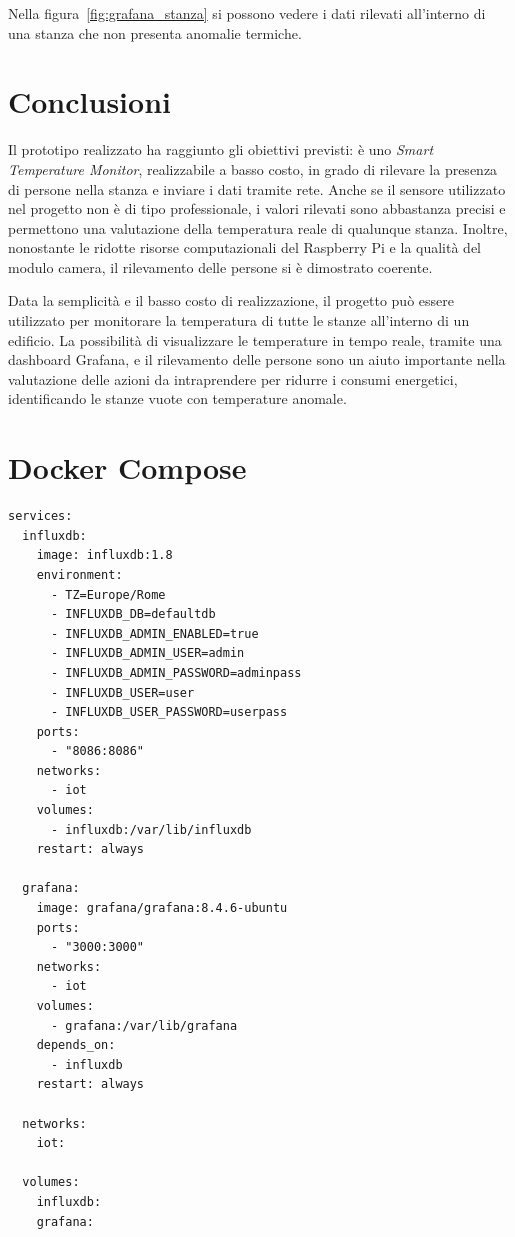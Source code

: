 \documentclass[italian,12pt,a4paper,oneside,final]{report}
\begin{document}
Nella figura~\ref{fig:grafana_stanza} si possono vedere i dati rilevati all'interno di una stanza che non presenta anomalie termiche.

\newpage

\section{Conclusioni}
Il prototipo realizzato ha raggiunto gli obiettivi previsti: è uno \textit{Smart Temperature Monitor}, realizzabile a basso costo, in grado di rilevare la presenza di persone nella stanza e inviare i dati tramite rete.
Anche se il sensore utilizzato nel progetto non è di tipo professionale, i valori rilevati sono abbastanza precisi e permettono una valutazione della temperatura reale di qualunque stanza.
Inoltre, nonostante le ridotte risorse computazionali del Raspberry Pi e la qualità del modulo camera, il rilevamento delle persone si è dimostrato coerente.

Data la semplicità e il basso costo di realizzazione, il progetto può essere utilizzato per monitorare la temperatura di tutte le stanze all'interno di un edificio.
La possibilità di visualizzare le temperature in tempo reale, tramite una dashboard Grafana, e il rilevamento delle persone sono un aiuto importante nella valutazione delle azioni da intraprendere per ridurre i consumi energetici, identificando le stanze vuote con temperature anomale.

\appendices
{}

\section{Docker Compose}
\begin{lstlisting}[caption=docker-compose.yaml]
services:
  influxdb:
    image: influxdb:1.8
    environment:
      - TZ=Europe/Rome
      - INFLUXDB_DB=defaultdb
      - INFLUXDB_ADMIN_ENABLED=true
      - INFLUXDB_ADMIN_USER=admin
      - INFLUXDB_ADMIN_PASSWORD=adminpass
      - INFLUXDB_USER=user
      - INFLUXDB_USER_PASSWORD=userpass
    ports:
      - "8086:8086"
    networks:
      - iot
    volumes:
      - influxdb:/var/lib/influxdb
    restart: always

  grafana:
    image: grafana/grafana:8.4.6-ubuntu
    ports:
      - "3000:3000"
    networks:
      - iot
    volumes:
      - grafana:/var/lib/grafana
    depends_on:
      - influxdb
    restart: always

  networks:
    iot:

  volumes:
    influxdb:
    grafana:
\end{lstlisting}
\end{document}
